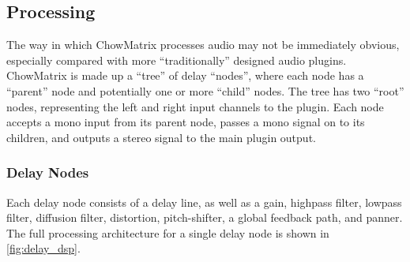\documentclass[landscape,twocolumn,a5paper]{manual}
\begin{document}
\subsection{Processing}
The way in which ChowMatrix processes audio may not
be immediately obvious, especially compared with more
``traditionally'' designed audio plugins. ChowMatrix is
made up a ``tree'' of delay ``nodes'', where each node has
a ``parent'' node and potentially one or more ``child'' nodes.
The tree has two ``root'' nodes, representing the left and right
input channels to the plugin. Each node accepts a mono input
from its parent node, passes a mono signal on to its children,
and outputs a stereo signal to the main plugin output.

\subsubsection{Delay Nodes}
Each delay node consists of a delay line, as well as a gain,
highpass filter, lowpass filter, diffusion filter, distortion,
pitch-shifter, a global feedback path, and panner. The full
processing architecture for a single delay node is shown in
\cref{fig:delay_dsp}.
\newpar
%
\end{document}
